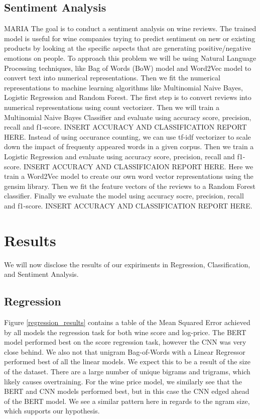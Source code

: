 \documentclass[11pt,english]{article}
\begin{document}
\subsection{Sentiment Analysis}
    MARIA
    The goal is to conduct a sentiment analysis on wine reviews. The trained model is useful for wine companies trying to predict sentiment on new or existing products by looking at the specific aspects that are generating positive/negative emotions on people.   
    To approach this problem we will be using Natural Language Processing techniques, like Bag of Words (BoW) model and Word2Vec model to convert text into numerical representations. Then we fit the numerical representations to machine learning algorithms like Multinomial Naive Bayes, Logistic Regression and Random Forest. 
    The first step is to convert reviews into numerical representations using count vectorizer. Then we will train a Multinomial Naive Bayes Classifier and evaluate using accuracy score, precision, recall and f1-score. 
    INSERT ACCURACY AND CLASSIFICATION REPORT HERE.
    Instead of using occurance counting, we can use tf-idf vectorizer to scale down the impact of frequenty appeared words in a given corpus. Then we train a Logistic Regression and evaluate using accuracy score, precision, recall and f1-score. 
    INSERT ACCURACY AND CLASSIFICAION REPORT HERE. 
    Here we train a Word2Vec model to create our own word vector representations using the gensim library. Then we fit the feature vectors of the reviews to a Random Forest classifier. Finally we evaluate the model using accuracy socre, precision, recall and f1-score. 
    INSERT ACCURACY AND CLASSIFICATION REPORT HERE. 

\section{Results}
    We will now disclose the results of our expiriments in Regression, Classification, and Sentiment Analysis.

\subsection{Regression}
    Figure \ref{regression_results} contains a table of the Mean Squared Error achieved by all models the regression task for both wine score and log-price. The BERT model performed best on the score regression task, however the CNN was very close behind. We also not that unigram Bag-of-Words with a Linear Regressor performed best of all the linear models. We expect this to be a result of the size of the dataset. There are a large number of unique bigrams and trigrams, which likely causes overtraining. For the wine price model, we similarly see that the BERT and CNN models performed best, but in this case the CNN edged ahead of the BERT model. We see a similar pattern here in regards to the ngram size, which supports our hypothesis.
\end{document}
